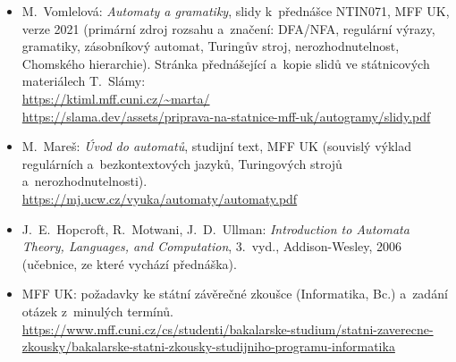 \documentclass[11pt,a4paper]{article}
\begin{document}
{\raggedright
\begin{itemize}
  \item M.~Vomlelová: \emph{Automaty a gramatiky}, slidy k~přednášce NTIN071, MFF UK, verze 2021 (primární zdroj rozsahu a~značení: DFA/NFA, regulární výrazy, gramatiky, zásobníkový automat, Turingův stroj, nerozhodnutelnost, Chomského hierarchie). Stránka přednášející a~kopie slidů ve státnicových materiálech T.~Slámy:\\ \url{https://ktiml.mff.cuni.cz/~marta/}\\ \url{https://slama.dev/assets/priprava-na-statnice-mff-uk/autogramy/slidy.pdf}
  \item M.~Mareš: \emph{Úvod do automatů}, studijní text, MFF UK (souvislý výklad regulárních a~bezkontextových jazyků, Turingových strojů a~nerozhodnutelnosti).\\ \url{https://mj.ucw.cz/vyuka/automaty/automaty.pdf}
  \item J.~E.~Hopcroft, R.~Motwani, J.~D.~Ullman: \emph{Introduction to Automata Theory, Languages, and Computation}, 3.~vyd., Addison-Wesley, 2006 (učebnice, ze které vychází přednáška).
  \item MFF UK: požadavky ke státní závěrečné zkoušce (Informatika, Bc.) a~zadání otázek z~minulých termínů.\\ \url{https://www.mff.cuni.cz/cs/studenti/bakalarske-studium/statni-zaverecne-zkousky/bakalarske-statni-zkousky-studijniho-programu-informatika}
\end{itemize}
\par}
\end{document}
